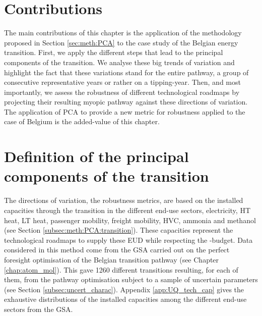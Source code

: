 \section*{Contributions}
\label{sec:RobPol:contributions}
The main contributions of this chapter is the application of the methodology proposed in Section \ref{sec:meth:PCA} to the case study of the Belgian energy transition. First, we apply the different steps that lead to the principal components of the transition. We analyse these big trends of variation and highlight the fact that these variations stand for the entire pathway, a group of consecutive representative years or rather on a tipping-year. Then, and most importantly, we assess the robustness of different technological roadmaps by projecting their resulting myopic pathway against these directions of variation. The application of \gls{PCA} to provide a new metric for robustness applied to the case of Belgium is the added-value of this chapter.

\section{Definition of the principal components of the transition}
\label{sec:RobPol:PC_transition}
The directions of variation, \ie the robustness metrics, are based on the installed capacities through the transition in the different end-use sectors, \ie electricity, \gls{HT} heat, \gls{LT} heat, passenger mobility, freight mobility, \gls{HVC}, ammonia and methanol (see Section \ref{subsec:meth:PCA:transition}). These capacities represent the technological roadmaps to supply these \gls{EUD} while respecting the -budget.  Data considered in this method come from the \gls{GSA} carried out on the perfect foresight optimisation of the Belgian transition pathway (see Chapter \ref{chap:atom_mol}). This gave 1260 different transitions resulting, for each of them, from the pathway optimisation subject to a sample of uncertain parameters (see Section \ref{subsec:uncert_charac}). Appendix \ref{app:UQ_tech_cap} gives the exhaustive distributions of the installed capacities among the different end-use sectors from the \gls{GSA}.

